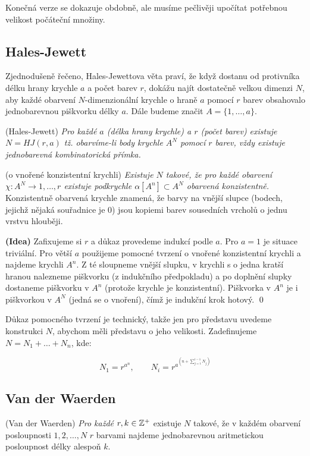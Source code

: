 Konečná verze se dokazuje obdobně, ale musíme pečlivěji upočítat potřebnou velikost počáteční množiny.

\subsection{Hales-Jewett}

Zjednodušeně řečeno, Hales-Jewettova věta praví, že když dostanu od protivníka délku hrany krychle $a$ a počet barev $r$, dokážu najít dostatečně velkou dimenzi $N$, aby každé obarvení $N$-dimenzionální krychle o hraně $a$ pomocí $r$ barev obsahovalo jednobarevnou piškvorku délky $a$. Dále budeme značit $A = \{1, \dots, a\}$.

\vt (Hales-Jewett) {\it Pro každé $a$ (délka hrany krychle) a $r$ (počet barev) existuje $N = HJ(r,a)$ tž. obarvíme-li body krychle $A^N$ pomocí $r$ barev, vždy existuje jednobarevná kombinatorická přímka.}

\tv (o vnořené konzistentní krychli) {\it Existuje $N$ takové, že pro každé obarvení $\chi: A^N \rightarrow {1,\dots, r}$ existuje podkrychle $\alpha[A^n] \subset A^N$ obarvená konzistentně.} Konzistentně obarvená krychle znamená, že barvy na vnější slupce (bodech, jejichž nějaká souřadnice je 0) jsou kopiemi barev sousedních vrcholů o jednu vrstvu hlouběji.

\dk \textbf{(Idea)} Zafixujeme si $r$ a důkaz provedeme indukcí podle $a$. Pro $a=1$ je situace triviální. Pro větší $a$ použijeme pomocné tvrzení o vnořené konzistentní krychli a najdeme krychli $A^n$. Z té sloupneme vnější slupku, v krychli s o jedna kratší hranou nalezneme piškvorku (z indukčního předpokladu) a po doplnění slupky dostaneme piškvorku v $A^n$ (protože krychle je konzistentní). Piškvorka v $A^n$ je i piškvorkou v $A^N$ (jedná se o vnoření), čímž je indukční krok hotový.
\qed

Důkaz pomocného tvrzení je technický, takže jen pro představu uvedeme konstrukci $N$, abychom měli představu o jeho velikosti. Zadefinujeme $N = N_1 + \dots + N_n$, kde:

$$N_1 = r^{a^n},\qquad N_i = r^{a^{\left(n+\sum_{j=1}^{i-1} N_j\right)}}$$

\subsection{Van der Waerden}

\vt (Van der Waerden) {\it Pro každé $r, k \in \mathbb{Z}^+$} existuje $N$ takové, že v každém obarvení posloupnosti ${1, 2, \dots, N}$ $r$ barvami najdeme jednobarevnou aritmetickou posloupnost délky alespoň $k$.

